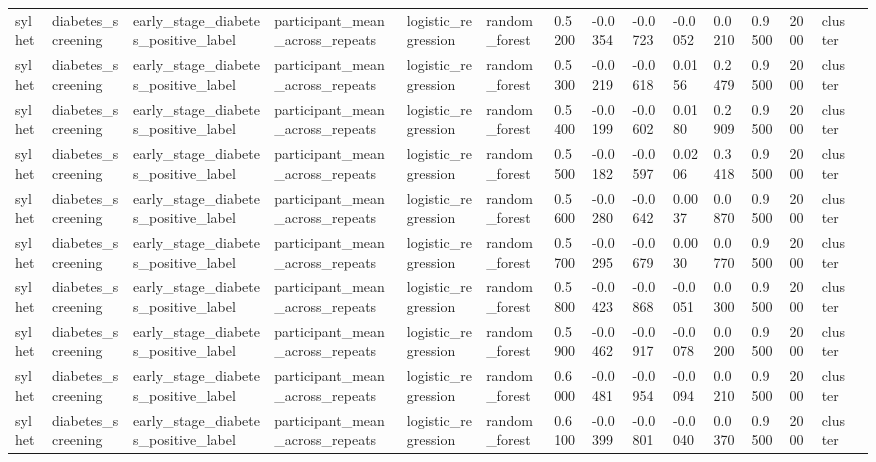\begin{tabular}{lllllllllllllll}
sylhet & diabetes\_screening & early\_stage\_diabetes\_positive\_label & participant\_mean\_across\_repeats & logistic\_regression & random\_forest & 0.5200 & -0.0354 & -0.0723 & -0.0052 & 0.0210 & 0.9500 & 2000 & cluster &  \\
sylhet & diabetes\_screening & early\_stage\_diabetes\_positive\_label & participant\_mean\_across\_repeats & logistic\_regression & random\_forest & 0.5300 & -0.0219 & -0.0618 & 0.0156 & 0.2479 & 0.9500 & 2000 & cluster &  \\
sylhet & diabetes\_screening & early\_stage\_diabetes\_positive\_label & participant\_mean\_across\_repeats & logistic\_regression & random\_forest & 0.5400 & -0.0199 & -0.0602 & 0.0180 & 0.2909 & 0.9500 & 2000 & cluster &  \\
sylhet & diabetes\_screening & early\_stage\_diabetes\_positive\_label & participant\_mean\_across\_repeats & logistic\_regression & random\_forest & 0.5500 & -0.0182 & -0.0597 & 0.0206 & 0.3418 & 0.9500 & 2000 & cluster &  \\
sylhet & diabetes\_screening & early\_stage\_diabetes\_positive\_label & participant\_mean\_across\_repeats & logistic\_regression & random\_forest & 0.5600 & -0.0280 & -0.0642 & 0.0037 & 0.0870 & 0.9500 & 2000 & cluster &  \\
sylhet & diabetes\_screening & early\_stage\_diabetes\_positive\_label & participant\_mean\_across\_repeats & logistic\_regression & random\_forest & 0.5700 & -0.0295 & -0.0679 & 0.0030 & 0.0770 & 0.9500 & 2000 & cluster &  \\
sylhet & diabetes\_screening & early\_stage\_diabetes\_positive\_label & participant\_mean\_across\_repeats & logistic\_regression & random\_forest & 0.5800 & -0.0423 & -0.0868 & -0.0051 & 0.0300 & 0.9500 & 2000 & cluster &  \\
sylhet & diabetes\_screening & early\_stage\_diabetes\_positive\_label & participant\_mean\_across\_repeats & logistic\_regression & random\_forest & 0.5900 & -0.0462 & -0.0917 & -0.0078 & 0.0200 & 0.9500 & 2000 & cluster &  \\
sylhet & diabetes\_screening & early\_stage\_diabetes\_positive\_label & participant\_mean\_across\_repeats & logistic\_regression & random\_forest & 0.6000 & -0.0481 & -0.0954 & -0.0094 & 0.0210 & 0.9500 & 2000 & cluster &  \\
sylhet & diabetes\_screening & early\_stage\_diabetes\_positive\_label & participant\_mean\_across\_repeats & logistic\_regression & random\_forest & 0.6100 & -0.0399 & -0.0801 & -0.0040 & 0.0370 & 0.9500 & 2000 & cluster &  \\

\end{tabular}
